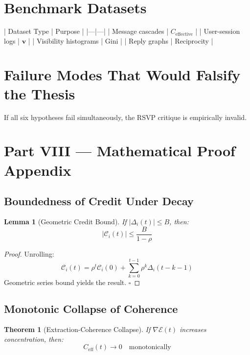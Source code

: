 \documentclass[11pt,a4paper]{article}
\theoremstyle{plain}
\newtheorem{theorem}{Theorem}[section]
\newtheorem{lemma}{Lemma}[section]
\theoremstyle{definition}
\theoremstyle{remark}
\newcommand{\vvec}{\mathbf{v}}
\begin{document}
\section{Benchmark Datasets}

| Dataset Type | Purpose |
|---|---|
| Message cascades | $C_{\text{effective}}$ |
| User-session logs | $\vvec$ |
| Visibility histograms | Gini |
| Reply graphs | Reciprocity |

\section{Failure Modes That Would Falsify the Thesis}

If all six hypotheses fail simultaneously, the RSVP critique is empirically invalid.

\newpage

\section*{Part VIII — Mathematical Proof Appendix}

\subsection{Boundedness of Credit Under Decay}

\begin{lemma}[Geometric Credit Bound]
If $|\Delta_i(t)| \le B$, then:
\[
|\mathcal{C}_i(t)| \le \frac{B}{1-\rho}
\]
\end{lemma}

\begin{proof}
Unrolling:
\[
\mathcal{C}_i(t) = \rho^t \mathcal{C}_i(0) + \sum_{k=0}^{t-1} \rho^k \Delta_i(t-k-1)
\]
Geometric series bound yields the result. $\square$
\end{proof}

\subsection{Monotonic Collapse of Coherence}

\begin{theorem}[Extraction-Coherence Collapse]
If $\nabla \mathcal{E}(t)$ increases concentration, then:
\[
C_{\text{eff}}(t) \rightarrow 0 \quad \text{monotonically}
\]
\end{theorem}
\end{document}
